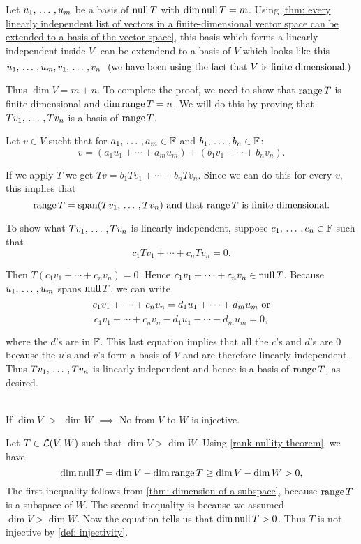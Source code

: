 \begin{prf}
  Let $u_1, {\, \ldots \,\,}, u_m$ be a basis of $\operatorname{null} T$ with $\dim \operatorname{null} T = m$. Using \ref{thm: every linearly independent list of vectors in a finite-dimensional vector space can be extended to a basis of the vector space}, this basis which forms a linearly independent inside $V$, can be extendend to a basis of $V$ which looks like this
  \[
    u_1, {\, \ldots \,\,}, u_m, v_1, {\, \ldots \,\,}, v_n \;\;\, \text{(we have been using the fact that $V$ is finite-dimensional.)}\;\;
  \]

  Thus $\dim V = m+n$. To complete the proof, we need to show that $\operatorname{range} T$ is finite-dimensional and $\dim \operatorname{range} T = n$. We will do this by proving that $Tv_1, {\, \ldots \,\,}, Tv_n$ is a basis of $\operatorname{range} T$.

  Let $v \in V$ sucht that for $a_1, {\, \ldots \,\,}, a_m \in \mathbb{F}$ and $b_1, {\, \ldots \,\,}, b_n \in \mathbb{F}$:
  \[
    v= (a_1 u_1 + \cdots + a_m  u_m) + (b_1 v_1 + \cdots + b_n v_n).
  \]

  If we apply $T$ we get $Tv=b_1Tv_1+ \cdots + b_nTv_n$. Since we can do this for every $v$, this implies that
  \[
    \myrange T = \myspan{Tv_1, \ddd, Tv_n} $ and that $\myrange T$ is finite dimensional.$
  \]

   To show what $Tv_1, {\, \ldots \,\,}, Tv_n$ is linearly independent, suppose $c_1, {\, \ldots \,\,}, c_n \in \mathbb{F}$ such that
  \[
    c_1 Tv_1 + \cdots + c_n T v_n = 0.
  \]

  Then $T(c_1 v_1 + \cdots + c_n v_n) = 0.$ Hence $c_1 v_1 + \cdots + c_n v_n \in \operatorname{null} T$. Because $u_1, {\, \ldots \,\,}, u_m$ spans $\operatorname{null} T$, we can write
  \[
    c_1 v_1 + \cdots + c_n v_n = d_1 u_1 + \cdots +  d_m u_m $ or$
  \]
  \[
  c_1 v_1 + \cdots + c_n v_n - d_1 u_1 - \cdots - d_m u_m = 0,
  \]

  where the $d$'s are in $\mathbb{F}$. This last equation implies that all the $c$'s and $d$'s are $0$ because the $u$'s and $v$'s form a basis of $V$ and are therefore linearly-independent. Thus $Tv_1, {\, \ldots \,\,}, Tv_n$ is linearly independent and hence is a basis of $\operatorname{range} T$, as desired.
\end{prf}


  \setcounter{thm}{21}
  \begin{thm} 
    \label{thm: linear-map-to-a-lower-dimensional-space-is-not-injective}
    \phantom{.}\\
    If $\dim V$ $>$ $\dim W$
    $\implies$ No \lm from $V$ to $W$ is injective.
  \end{thm}
  \begin{prf} Let $T\in \mathcal{L}(V,W)$ such that $\dim V > \dim W$. Using \ref{rank-nullity-theorem}, we have
    \begin{equation}
      \dim \operatorname{null} T = \dim V - \dim \operatorname{range} T \geq \dim V - \dim W > 0,
    \end{equation}
    The first inequality follows from \ref{thm: dimension of a subspace}, because $\operatorname{range} T$ is a subspace of $W$. The second inequality is because we assumed $\dim V > \dim W$. Now the equation tells us that $\dim \operatorname{null} T > 0$. Thus $T$ is not injective by \ref{def: injectivity}.
  \end{prf}

